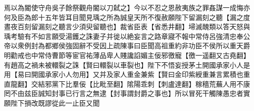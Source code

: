 焉以為閽使守舟吳子餘祭觀舟閽以刀弑之】今以不忍之恩赦夷族之罪姦謀一成悔亦何及臣為郎十五年皆耳目聞見瑀之所為誠皇天所不復赦願陛下留漏刻之聽【漏之度晝夜百刻留漏刻之聽言少須臾留聽也】裁省臣表【省悉井翻】埽滅醜類以答天怒與瑀考驗有不如言願受湯鑊之誅妻子并徙以絶妄言之路章寢不報中常侍呂強清忠奉公帝以衆例封為都鄉侯強固辭不受因上疏陳事曰臣聞高祖重約非功臣不侯所以重天爵明勸戒也中常侍曹節等宦官祐薄品卑人賤讒諂媚主佞邪徼寵【徼一遥翻又古堯翻】有趙高之禍未被轘裂之誅【賢曰轘裂以車裂也】陛下不悟妄授茅土開國承家小人是用【易曰開國承家小人勿用】又并及家人重金兼紫【賢曰金印紫綬重兼言累積也重直龍翻】交結邪黨下比羣佞【比毗至翻】隂陽乖刺【刺盧達翻】稼穡荒蕪人用不康罔不由兹臣誠知封事已行言之無逮【封事謂封爵之事也】所以冒死干觸陳愚忠者實願陛下損改既謬從此一止臣又聞